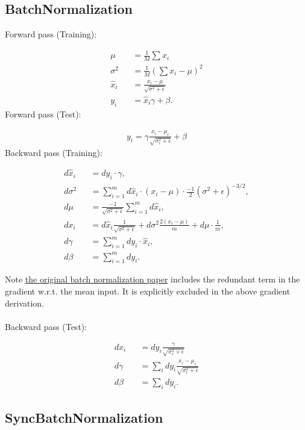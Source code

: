 \documentclass{article}
\begin{document}
\subsection{BatchNormalization}

Forward pass (Training):

\begin{eqnarray}
  \mu &&= \frac{1}{M} \sum x_i \\
  \sigma^2 &&= \frac{1}{M} \left(\sum x_i - \mu\right)^2 \\
  \hat{x}_i &&= \frac{x_i - \mu}{\sqrt{\sigma^2 + \epsilon}} \\
  y_i &&= \hat{x}_i \gamma + \beta.
\end{eqnarray}
%
Forward pass (Test):

\begin{eqnarray}
  y_i = \gamma \frac{x_i - \mu_r}{\sqrt{\sigma_r^2 + \epsilon}} + \beta
\end{eqnarray}
%
Backward pass (Training):

\begin{eqnarray}
  d\hat{x}_i &&= dy_i \cdot \gamma, \\
  d\sigma^2 &&= \sum_{i=1}^m d\hat{x}_i \cdot (x_i - \mu) \cdot \frac{-1}{2}(\sigma^2 + \epsilon)^{-3/2}, \\
  d\mu &&= \frac{-1}{\sqrt{\sigma^2 + \epsilon}} \sum_{i=1}^{m} d\hat{x}_i, \\
  dx_i &&= d\hat{x}_i \frac{1}{\sqrt{\sigma^2 + \epsilon}} + d\sigma^2 \frac{2(x_i - \mu)}{m} + d\mu \cdot \frac{1}{m}, \\
  d\gamma &&= \sum_{i=1}^{m} dy_i \cdot \hat{x}_i, \\
  d\beta &&= \sum_{i=1}^{m} dy_i.
\end{eqnarray}

Note \href{https://arxiv.org/abs/1502.03167}{the original batch normalization paper} includes the redundant term in the gradient w.r.t. the mean input. It is explicitly excluded in the above gradient derivation.\\\\
%
Backward pass (Test):

\begin{eqnarray}
  dx_i &&= dy_i \frac{\gamma}{\sqrt{\sigma_r^2 + \epsilon}} \\
  d\gamma &&= \sum_i dy_i \frac{x_i - \mu_r}{\sqrt{\sigma_r^2 + \epsilon}} \\
  d\beta &&= \sum_i dy_i.
\end{eqnarray}

\subsection{SyncBatchNormalization}
\end{document}
